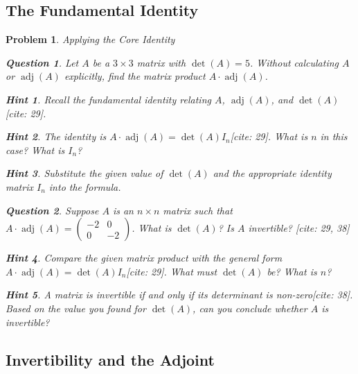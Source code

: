 \documentclass[12pt]{article}
\newtheorem{problem}{Problem}[section]
\newtheorem{question}{Question}[problem]
\theoremstyle{definition}
\newtheorem{hint}{Hint}[question]
\newcommand{\adj}{\operatorname{adj}}
\newcommand{\detm}{\operatorname{det}}
\begin{document}
\subsection{The Fundamental Identity}

\begin{problem}{Applying the Core Identity}
    \begin{question}
        Let $A$ be a $3 \times 3$ matrix with $\detm(A) = 5$. Without calculating $A$ or $\adj(A)$ explicitly, find the matrix product $A \cdot \adj(A)$.
    \end{question}
    
        \begin{hint}
            Recall the fundamental identity relating $A$, $\adj(A)$, and $\detm(A)$[cite: 29].
        \end{hint}
        \begin{hint}
            The identity is $A \cdot \adj(A) = \detm(A) I_n$[cite: 29]. What is $n$ in this case? What is $I_n$?
        \end{hint}
        \begin{hint}
            Substitute the given value of $\detm(A)$ and the appropriate identity matrix $I_n$ into the formula.
        \end{hint}
    

    \begin{question}
        Suppose $A$ is an $n \times n$ matrix such that $A \cdot \adj(A) = \begin{pmatrix} -2 & 0 \\ 0 & -2 \end{pmatrix}$. What is $\detm(A)$? Is $A$ invertible? [cite: 29, 38]
    \end{question}
    
        \begin{hint}
             Compare the given matrix product with the general form $A \cdot \adj(A) = \detm(A) I_n$[cite: 29]. What must $\detm(A)$ be? What is $n$?
        \end{hint}
        \begin{hint}
             A matrix is invertible if and only if its determinant is non-zero[cite: 38]. Based on the value you found for $\detm(A)$, can you conclude whether $A$ is invertible?
        \end{hint}
    
\end{problem}

\subsection{Invertibility and the Adjoint}
\end{document}
